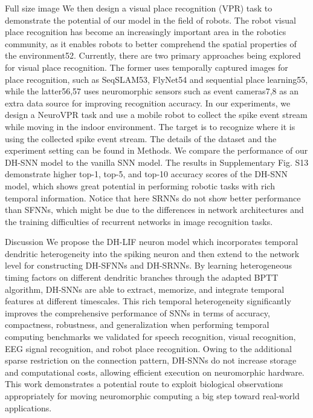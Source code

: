 Full size image
We then design a visual place recognition (VPR) task to demonstrate the potential of our model in the field of robots. The robot visual place recognition has become an increasingly important area in the robotics community, as it enables robots to better comprehend the spatial properties of the environment52. Currently, there are two primary approaches being explored for visual place recognition. The former uses temporally captured images for place recognition, such as SeqSLAM53, FlyNet54 and sequential place learning55, while the latter56,57 uses neuromorphic sensors such as event cameras7,8 as an extra data source for improving recognition accuracy. In our experiments, we design a NeuroVPR task and use a mobile robot to collect the spike event stream while moving in the indoor environment. The target is to recognize where it is using the collected spike event stream. The details of the dataset and the experiment setting can be found in Methods. We compare the performance of our DH-SNN model to the vanilla SNN model. The results in Supplementary Fig. S13 demonstrate higher top-1, top-5, and top-10 accuracy scores of the DH-SNN model, which shows great potential in performing robotic tasks with rich temporal information. Notice that here SRNNs do not show better performance than SFNNs, which might be due to the differences in network architectures and the training difficulties of recurrent networks in image recognition tasks.

Discussion
We propose the DH-LIF neuron model which incorporates temporal dendritic heterogeneity into the spiking neuron and then extend to the network level for constructing DH-SFNNs and DH-SRNNs. By learning heterogeneous timing factors on different dendritic branches through the adapted BPTT algorithm, DH-SNNs are able to extract, memorize, and integrate temporal features at different timescales. This rich temporal heterogeneity significantly improves the comprehensive performance of SNNs in terms of accuracy, compactness, robustness, and generalization when performing temporal computing benchmarks we validated for speech recognition, visual recognition, EEG signal recognition, and robot place recognition. Owing to the additional sparse restriction on the connection pattern, DH-SNNs do not increase storage and computational costs, allowing efficient execution on neuromorphic hardware. This work demonstrates a potential route to exploit biological observations appropriately for moving neuromorphic computing a big step toward real-world applications.

